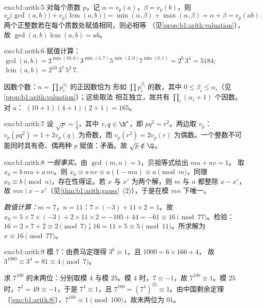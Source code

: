 \begin{solution}{exo:b1:arith:5}
对每个质数 $p$，记 $\alpha = v_p(a)$，$\beta = v_p(b)$，则
\[
v_p\bigl(\gcd(a,b)\bigr) + v_p\bigl(\operatorname{lcm}(a,b)\bigr)
= \min(\alpha, \beta) + \max(\alpha, \beta)
= \alpha + \beta = v_p(ab) .
\]
两个正整数若在每个质数处赋值相同，则必相等
（见\cref{prop:b1:arith:valuation}），故 $\gcd(a,b)\operatorname{lcm}(a,b)
= ab$。
\end{solution}

\begin{solution}{exo:b1:arith:6}
赋值计算：$\gcd(a, b) = 2^{\min(10,6)} 3^{\min(4,7)} 5^{\min(2,0)}
7^{\min(0,1)} = 2^6\, 3^4 = 5184$;
$\operatorname{lcm}(a,b) = 2^{10}\, 3^7\, 5^2\, 7$.

因数个数：$n = \prod p_i^{\alpha_i}$ 的正因数恰为
形如 $\prod p_i^{\beta_i}$ 的数，其中 $0 \leq \beta_i \leq
\alpha_i$（见\cref{prop:b1:arith:valuation}）；这些取法
相互独立，故共有 $\prod_i (\alpha_i + 1)$ 个因数。对 $a$：
$(10+1)(4+1)(2+1) = 165$。
\end{solution}

\begin{solution}{exo:b1:arith:7}
设 $\sqrt p = \frac rq$，其中 $r, q \in \N^*$，即 $p q^2 =
r^2$。两边取 $v_p$：$v_p(pq^2) = 1 + 2v_p(q)$ 为奇数，而 $v_p(r^2)
= 2 v_p(r)$ 为偶数。一个整数不可能同时具有奇、偶两种
$p$ 赋值：矛盾。故 $\sqrt p \notin \Q$。
\end{solution}

\begin{solution}{exo:b1:arith:8}
\emph{一般事实。}由 $\gcd(m,n) = 1$，贝祖等式给出 $mu + nv = 1$。
取 $x_0 = b\,mu + a\,nv$。则 $x_0 \equiv a\,nv \equiv a(1 - mu)
\equiv a \pmod m$，同理 $x_0 \equiv b \pmod n$，存在性得证。若
$x$ 与 $x'$ 为两个解，则 $m$ 与 $n$ 都整除 $x - x'$，
故 $mn \mid x - x'$（见\cref{thm:b1:arith:gauss}~(2)），于是在模
$mn$ 下唯一。

\emph{数值计算：}$m = 7$，$n = 11$：$7 \times (-3) + 11 \times 2 =
1$。故 $x_0 = 5 \times 7 \times (-3) + 2 \times 11 \times 2 = -105 +
44 = -61 \equiv 16 \pmod{77}$。检验：$16 = 2\times 7 + 2 \equiv 2
\pmod 7$；$16 = 11 + 5 \equiv 5 \pmod{11}$。所求解为 $x \equiv 16
\pmod{77}$。
\end{solution}

\begin{solution}{exo:b1:arith:9}
模 $7$：由费马定理得 $3^6 \equiv 1$，且 $1000 = 6 \times 166 + 4$，
故 $3^{1000} \equiv 3^4 = 81 \equiv 4 \pmod 7$。

求 $7^{100}$ 的末两位：分别取模 $4$ 与模 $25$。模 $4$ 时，$7
\equiv -1$，故 $7^{100} \equiv 1$。模 $25$ 时，$7^2 = 49 \equiv -1$，于是
$7^4 \equiv 1$，且 $7^{100} = (7^4)^{25} \equiv 1$。由中国剩余定理
（\cref{exo:b1:arith:8}），$7^{100} \equiv 1
\pmod{100}$，故末两位为 $01$。
\end{solution}

